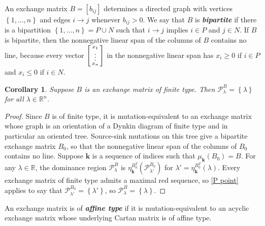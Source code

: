 \documentclass{amsart}
\newtheorem{corollary}[proposition]{Corollary}
\theoremstyle{definition}
\theoremstyle{remark}
\numberwithin{equation}{section}
\newcommand{\newword}[1]{\textbf{\emph{#1}}}
\newcommand{\reals}{\mathbb R}
\newcommand{\set}[1]{{\left\lbrace #1 \right\rbrace}}
\newcommand{\0}{{\mathbf{0}}}
\newcommand{\kk}{\mathbf{k}}
\newcommand{\x}{\mathbf{x}}
\renewcommand{\P}{\mathcal{P}}
\begin{document}
An exchange matrix $B=[b_{ij}]$ determines a directed graph with vertices $\set{1,\ldots,n}$ and edges $i\to j$ whenever $b_{ij}>0$.
We say that $B$ is \newword{bipartite} if there is a bipartition $\set{1,\ldots,n}=P\cup N$ such that $i\to j$ implies $i\in P$ and $j\in N$.
If $B$ is bipartite, then the nonnegative linear span of the columns of $B$ contains no line, because every vector $\begin{bsmallmatrix}x_1\\\vdots\\x_n\end{bsmallmatrix}$ in the nonnegative linear span has $x_i\ge0$ if $i\in P$ and $x_i\le0$ if $i\in N$.

\begin{corollary}\label{finite P point}  
Suppose $B$ is an exchange matrix of finite type.
Then $\P^B_\lambda=\set{\lambda}$ for all $\lambda\in\reals^n$.
\end{corollary}
\begin{proof}
Since $B$ is of finite type, it is mutation-equivalent to an exchange matrix whose graph is an orientation of a Dynkin diagram of finite type and in particular an oriented tree.
Source-sink mutations on this tree give a bipartite exchange matrix $B_0$, so that the nonnegative linear span of the columns of $B_0$ contains no line.
Suppose $\kk$ is a sequence of indices such that $\mu_\kk(B_0)=B$.
For any $\lambda\in\reals$, the dominance region $\P_\lambda^B$ is $\eta_\kk^{B_0^T}(\P_{\lambda'}^{B_0})$ for $\lambda'=\eta_\kk^{B_0^T}(\lambda)$.
Every exchange matrix of finite type admits a maximal red sequence, so \cref{P point} applies to say that $\P_{\lambda'}^{B_0}=\set{\lambda'}$, so $\P_\lambda^B=\set{\lambda}$.
\end{proof}

An exchange matrix is of \newword{affine type} if it is mutation-equivalent to an acyclic exchange matrix whose underlying Cartan matrix is of affine type.
\end{document}
